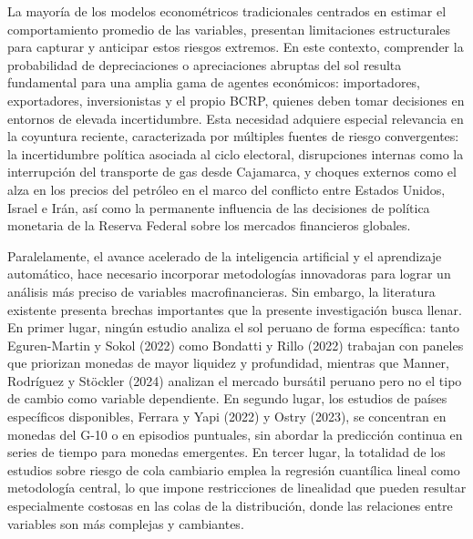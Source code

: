 ﻿\documentclass[11pt,a4paper]{article}
\begin{document}
La mayoría de los modelos econométricos tradicionales centrados en estimar el comportamiento promedio de las variables, presentan limitaciones estructurales para capturar y anticipar estos riesgos extremos. En este contexto, comprender la probabilidad de depreciaciones o apreciaciones abruptas del sol resulta fundamental para una amplia gama de agentes económicos: importadores, exportadores, inversionistas y el propio BCRP, quienes deben tomar decisiones en entornos de elevada incertidumbre. 
Esta necesidad adquiere especial relevancia en la coyuntura reciente, caracterizada por múltiples fuentes de riesgo convergentes: la incertidumbre política asociada al ciclo electoral, disrupciones internas como la interrupción del transporte de gas desde Cajamarca, y choques externos como el alza en los precios del petróleo en el marco del conflicto entre Estados Unidos, Israel e Irán, así como la permanente influencia de las decisiones de política monetaria de la Reserva Federal sobre los mercados financieros globales. 

Paralelamente, el avance acelerado de la inteligencia artificial y el aprendizaje automático, hace necesario incorporar metodologías innovadoras para lograr un análisis más preciso de variables macrofinancieras. Sin embargo, la literatura existente presenta brechas importantes que la presente investigación busca llenar. En primer lugar, ningún estudio analiza el sol peruano de forma específica: tanto Eguren-Martin y Sokol (2022) como Bondatti y Rillo (2022) trabajan con paneles que priorizan monedas de mayor liquidez y profundidad, mientras que Manner, Rodríguez y Stöckler (2024) analizan el mercado bursátil peruano pero no el tipo de cambio como variable dependiente. En segundo lugar, los estudios de países específicos disponibles, Ferrara y Yapi (2022) y Ostry (2023), se concentran en monedas del G-10 o en episodios puntuales, sin abordar la predicción continua en series de tiempo para monedas emergentes. En tercer lugar, la totalidad de los estudios sobre riesgo de cola cambiario emplea la regresión cuantílica lineal como metodología central, lo que impone restricciones de linealidad que pueden resultar especialmente costosas en las colas de la distribución, donde las relaciones entre variables son más complejas y cambiantes. 
\end{document}
